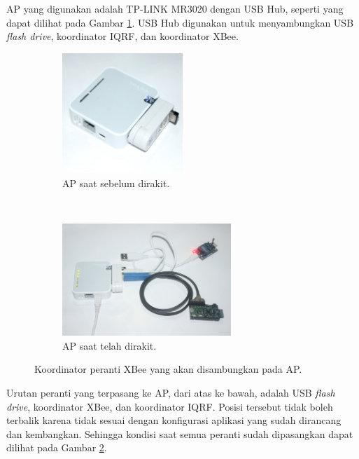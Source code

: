 			AP yang digunakan adalah TP-LINK MR3020 dengan USB Hub, seperti yang dapat dilihat pada Gambar \ref{ap-stripped}. USB Hub digunakan untuk menyambungkan USB \emph{flash drive}, koordinator IQRF, dan koordinator XBee.

			\begin{figure}[H]
				\begin{subfigure}[b]{\textwidth}
					\centering
				    \includegraphics[width=0.5\textwidth]{gambar/ap-stripped}
				    \caption{AP saat sebelum dirakit.}
				    \label{ap-stripped}
				\end{subfigure}
				 ~
				\begin{subfigure}[b]{\textwidth}
					\centering
				    \includegraphics[width=0.7\textwidth]{gambar/ap-complete}
				    \caption{AP saat telah dirakit.}
				    \label{ap-complete}
				\end{subfigure}
				\caption{Koordinator peranti XBee yang akan disambungkan pada AP.}
				\label{xbee-sink}
			\end{figure}

			Urutan peranti yang terpasang ke AP, dari atas ke bawah, adalah USB \emph{flash drive}, koordinator XBee, dan koordinator IQRF. Posisi tersebut tidak boleh terbalik karena tidak sesuai dengan konfigurasi aplikasi yang sudah dirancang dan kembangkan. Sehingga kondisi saat semua peranti sudah dipasangkan dapat dilihat pada Gambar \ref{ap-complete}.

